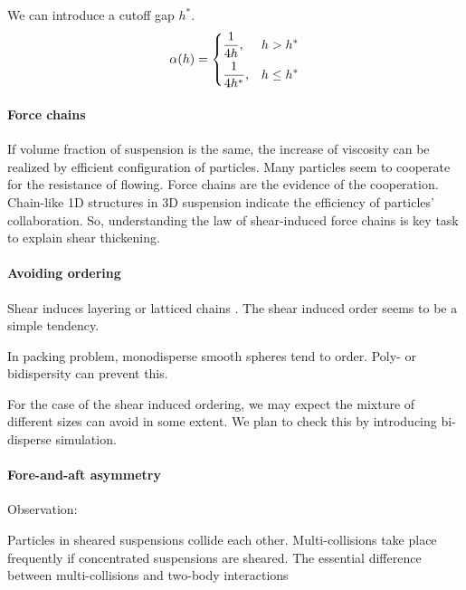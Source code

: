 \documentclass[12pt]{article}
\begin{document}
We can introduce a cutoff gap $h^{\ast}$.
\begin{equation}
 \alpha(h) =
\begin{dcases}
\displaystyle \frac{1}{4h} , & h > h^{\ast} \\
\displaystyle  \frac{1}{4h^{\ast}} , & h \leq h^{\ast} 
\end{dcases}
\end{equation}


\paragraph{Force chains}

If volume fraction of suspension is the same,
the increase of viscosity can be realized
by efficient configuration of particles.
%
Many particles seem to cooperate for the resistance of flowing.
%
Force chains are the evidence of the cooperation.
%
Chain-like 1D structures in 3D suspension
indicate the efficiency of particles' collaboration.
%
So, understanding the law of shear-induced force chains
is key task to explain shear thickening.

\paragraph{Avoiding ordering}

Shear induces layering or latticed chains \citep{Catherall_2000}.
%
The shear induced order seems to be a simple tendency.
%

In packing problem,
monodisperse smooth spheres tend to order.
%
Poly- or bidispersity can prevent this.

For the case of the shear induced ordering,
we may expect the mixture of different sizes can avoid in some extent.
%
We plan to check this by introducing bi-disperse simulation.
%

\paragraph{Fore-and-aft asymmetry}

\citet{Parsi_1987}


Observation:

Particles in sheared suspensions collide each other.
%
Multi-collisions take place frequently
if concentrated suspensions are sheared.
%
The essential difference 
between multi-collisions and two-body interactions
\end{document}
